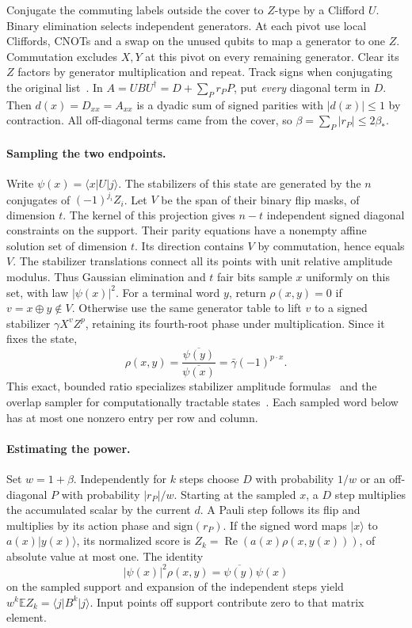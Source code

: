 \documentclass[11pt]{article}
\newcommand{\ket}[1]{\lvert #1\rangle}
\newcommand{\bra}[1]{\langle #1\rvert}
\begin{document}
Conjugate the commuting labels outside the cover to \(Z\)-type by a Clifford \(U\). Binary elimination selects independent generators. At each pivot use local Cliffords, CNOTs and a swap on the unused qubits to map a generator to one \(Z\). Commutation excludes \(X,Y\) at this pivot on every remaining generator. Clear its \(Z\) factors by generator multiplication and repeat. Track signs when conjugating the original list~\cite{ddm}. In \(A=UBU^\dagger=D+\sum_P r_PP\), put \emph{every} diagonal term in \(D\). Then \(d(x)=D_{xx}=A_{xx}\) is a dyadic sum of signed parities with \(|d(x)|\le1\) by contraction. All off-diagonal terms came from the cover, so \(\beta=\sum_P|r_P|\le2\beta_*\).

\paragraph{Sampling the two endpoints.}
Write \(\psi(x)=\langle x|U|j\rangle\). The stabilizers of this state are generated by the \(n\) conjugates of \((-1)^{j_i}Z_i\). Let \(V\) be the span of their binary flip masks, of dimension \(t\). The kernel of this projection gives \(n-t\) independent signed diagonal constraints on the support. Their parity equations have a nonempty affine solution set of dimension \(t\). Its direction contains \(V\) by commutation, hence equals \(V\). The stabilizer translations connect all its points with unit relative amplitude modulus. Thus Gaussian elimination and \(t\) fair bits sample \(x\) uniformly on this set, with law \(|\psi(x)|^2\). For a terminal word \(y\), return \(\rho(x,y)=0\) if \(v=x\oplus y\notin V\). Otherwise use the same generator table to lift \(v\) to a signed stabilizer \(\gamma X^v Z^p\), retaining its fourth-root phase under multiplication. Since it fixes the state,
\[
 \rho(x,y)=\frac{\overline{\psi(y)}}{\overline{\psi(x)}}=
 \bar\gamma(-1)^{p\cdot x}.
\]
This exact, bounded ratio specializes stabilizer amplitude formulas~\cite{ddm} and the overlap sampler for computationally tractable states~\cite[Thm.~3]{vdn}. Each sampled word below has at most one nonzero entry per row and column.

\paragraph{Estimating the power.}
Set \(w=1+\beta\). Independently for \(k\) steps choose \(D\) with probability \(1/w\) or an off-diagonal \(P\) with probability \(|r_P|/w\). Starting at the sampled \(x\), a \(D\) step multiplies the accumulated scalar by the current \(d\). A Pauli step follows its flip and multiplies by its action phase and \(\mathrm{sign}(r_P)\). If the signed word maps \(\ket x\) to \(a(x)\ket{y(x)}\), its normalized score is \(Z_k=\operatorname{Re}(a(x)\rho(x,y(x)))\), of absolute value at most one. The identity
\[
 |\psi(x)|^2\rho(x,y)=\overline{\psi(y)}\psi(x)
\]
on the sampled support and expansion of the independent steps yield \(w^k\mathbb E Z_k=\bra j B^k\ket j\). Input points off support contribute zero to that matrix element.
\end{document}
